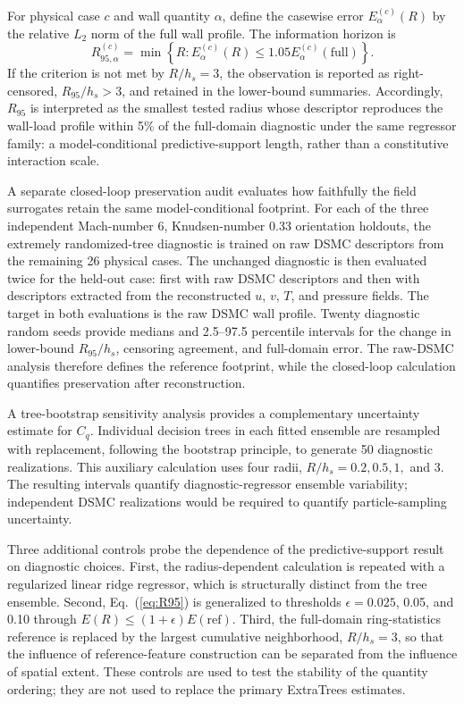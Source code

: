 \documentclass[aip,pof,preprint,floatfix,amsmath,amssymb]{revtex4-2}
\begin{document}
For physical case $c$ and wall quantity $\alpha$, define the casewise error $E_{\alpha}^{(c)}(R)$ by the relative $L_2$ norm of the full wall profile. The information horizon is
\begin{equation}
 R_{95,\alpha}^{(c)}=\min\left\{R:E_{\alpha}^{(c)}(R)\le1.05E_{\alpha}^{(c)}(\mathrm{full})\right\}.
 \label{eq:R95}
\end{equation}
If the criterion is not met by $R/h_s=3$, the observation is reported as right-censored, $R_{95}/h_s>3$, and retained in the lower-bound summaries. Accordingly, $R_{95}$ is interpreted as the smallest tested radius whose descriptor reproduces the wall-load profile within 5\% of the full-domain diagnostic under the same regressor family: a model-conditional predictive-support length, rather than a constitutive interaction scale.

A separate closed-loop preservation audit evaluates how faithfully the field surrogates retain the same model-conditional footprint. For each of the three independent Mach-number 6, Knudsen-number 0.33 orientation holdouts, the extremely randomized-tree diagnostic is trained on raw DSMC descriptors from the remaining 26 physical cases. The unchanged diagnostic is then evaluated twice for the held-out case: first with raw DSMC descriptors and then with descriptors extracted from the reconstructed $u$, $v$, $T$, and pressure fields. The target in both evaluations is the raw DSMC wall profile. Twenty diagnostic random seeds provide medians and 2.5--97.5 percentile intervals for the change in lower-bound $R_{95}/h_s$, censoring agreement, and full-domain error. The raw-DSMC analysis therefore defines the reference footprint, while the closed-loop calculation quantifies preservation after reconstruction.

A tree-bootstrap sensitivity analysis provides a complementary uncertainty estimate for $C_q$. Individual decision trees in each fitted ensemble are resampled with replacement, following the bootstrap principle, to generate 50 diagnostic realizations.\cite{Efron1979} This auxiliary calculation uses four radii, $R/h_s=0.2,0.5,1,$ and 3. The resulting intervals quantify diagnostic-regressor ensemble variability; independent DSMC realizations would be required to quantify particle-sampling uncertainty.

Three additional controls probe the dependence of the predictive-support result on diagnostic choices. First, the radius-dependent calculation is repeated with a regularized linear ridge regressor, which is structurally distinct from the tree ensemble. Second, Eq.~(\ref{eq:R95}) is generalized to thresholds $\epsilon=0.025$, 0.05, and 0.10 through $E(R)\le(1+\epsilon)E(\mathrm{ref})$. Third, the full-domain ring-statistics reference is replaced by the largest cumulative neighborhood, $R/h_s=3$, so that the influence of reference-feature construction can be separated from the influence of spatial extent. These controls are used to test the stability of the quantity ordering; they are not used to replace the primary ExtraTrees estimates.
\end{document}
